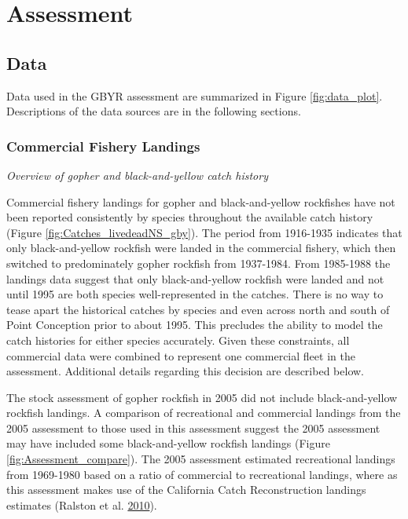 \documentclass[12pt,]{article}
\begin{document}
\section{Assessment}\label{assessment}

\subsection{Data}\label{data}

Data used in the GBYR assessment are summarized in Figure
\ref{fig:data_plot}. Descriptions of the data sources are in the
following sections.

\subsubsection{Commercial Fishery
Landings}\label{commercial-fishery-landings}

\emph{Overview of gopher and black-and-yellow catch history}

Commercial fishery landings for gopher and black-and-yellow rockfishes
have not been reported consistently by species throughout the available
catch history (Figure \ref{fig:Catches_livedeadNS_gby}). The period from
1916-1935 indicates that only black-and-yellow rockfish were landed in
the commercial fishery, which then switched to predominately gopher
rockfish from 1937-1984. From 1985-1988 the landings data suggest that
only black-and-yellow rockfish were landed and not until 1995 are both
species well-represented in the catches. There is no way to tease apart
the historical catches by species and even across north and south of
Point Conception prior to about 1995. This precludes the ability to
model the catch histories for either species accurately. Given these
constraints, all commercial data were combined to represent one
commercial fleet in the assessment. Additional details regarding this
decision are described below.

The stock assessment of gopher rockfish in 2005 did not include
black-and-yellow rockfish landings. A comparison of recreational and
commercial landings from the 2005 assessment to those used in this
assessment suggest the 2005 assessment may have included some
black-and-yellow rockfish landings (Figure
\ref{fig:Assessment_compare}). The 2005 assessment estimated
recreational landings from 1969-1980 based on a ratio of commercial to
recreational landings, where as this assessment makes use of the
California Catch Reconstruction landings estimates (Ralston et al.
\protect\hyperlink{ref-Ralston2010}{2010}).
\end{document}
